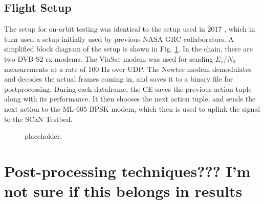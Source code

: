\subsection{Flight Setup}
\par The setup for on-orbit testing was identical to the setup used in 2017 \cite{tim_implementation}, which in turn used a setup initially used by previous NASA GRC collaborators. A simplified block diagram of the setup is shown in Fig. \ref{methods:flightTestFig}. In the chain, there are two DVB-S2 rx modems. The ViaSat modem was used for sending $E_s/N_0$ measurements at a rate of 100 Hz over UDP. The Newtec modem demodulates and decodes the actual frames coming in, and saves it to a binary file for postprocessing. During each dataframe, the CE saves the previous action tuple along with its performance. It then chooses the next action tuple, and sends the next action to the ML-605 BPSK modem, which then is used to uplink the signal to the SCaN Testbed.

\begin{figure}[ht]
\label{methods:flightTestFig}
\caption{placeholder.}
\end{figure} 

\section{Post-processing techniques??? I'm not sure if this belongs in results}
